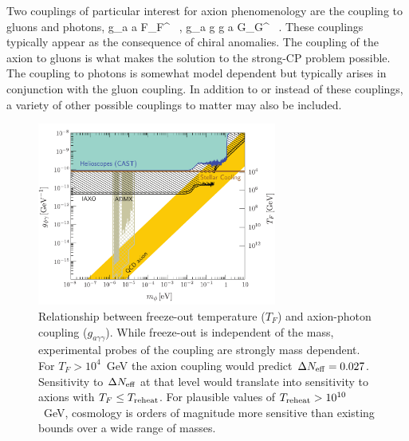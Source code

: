 Two couplings of particular interest for axion phenomenology are the coupling to gluons and photons, 
\beq
{} g_{a \gamma \gamma} a \tilde F_{\mu \nu}F^{\mu\nu} \ , \qquad \qquad {} g_{a g g} a \tilde G_{\mu \nu}G^{\mu\nu}  \ .
\eeq
These couplings typically appear as the consequence of chiral anomalies.  The coupling of the axion to gluons is what makes the solution to the strong-CP problem possible.  The coupling to photons is somewhat model dependent but typically arises in conjunction with the gluon coupling.  In addition to or instead of these couplings, a variety of other possible couplings to matter may also be included.

\begin{figure}[h!]
\centering \includegraphics[width=0.70\textwidth]{Neutrinos/AxionPhotonWithFuture.pdf}
\caption{Relationship between freeze-out temperature ($T_F$) and axion-photon coupling ($g_{a\gamma\gamma}$).  While freeze-out is independent of the mass, experimental probes of the coupling are strongly mass dependent.  For $T_F > 10^4$~GeV the axion coupling would predict $\Delta N_{\rm eff} = 0.027$.  Sensitivity to $\Delta N_{\rm eff}$ at that level would translate into sensitivity to axions with $T_F \leq T_{\rm reheat}$.  For plausible values of $T_{\rm reheat} > 10^{10}$~GeV, cosmology is orders of magnitude more sensitive than existing bounds over a wide range of masses.}
\label{fig:axionphoton}
\end{figure}



